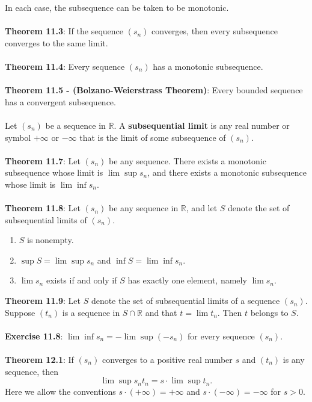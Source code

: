 \documentclass{article}
\theoremstyle{definition}
\DeclareMathOperator{\Inf}{inf}
\DeclareMathOperator{\Sup}{sup}
\begin{document}
In each case, the subsequence can be taken to be monotonic. \\ \\
\textbf{Theorem 11.3}: If the sequence $(s_n)$ converges, then every subsequence converges to the same limit. \\ \\
\textbf{Theorem 11.4}: Every sequence $(s_n)$ has a monotonic subsequence. \\ \\
\textbf{Theorem 11.5 - (Bolzano-Weierstrass Theorem)}: Every bounded sequence has a convergent subsequence. \\ \\
Let $(s_n)$ be a sequence in $\mathbb{R}$. A \textbf{subsequential limit} is any real number or symbol $+\infty$ or $-\infty$ that is the limit of some subsequence of $(s_n)$. \\ \\
\textbf{Theorem 11.7}: Let $(s_n)$ be any sequence. There exists a monotonic subsequence whose limit is $\lim\Sup s_n$, and there exists a monotonic subsequence whose limit is $\lim \Inf s_n$. \\ \\
\textbf{Theorem 11.8}: Let $(s_n)$ be any sequence in $\mathbb{R}$, and let $S$ denote the set of subsequential limits of $(s_n)$. \begin{enumerate}
    \item $S$ is nonempty.
    \item $\Sup S = \lim \Sup s_n$ and $\Inf S = \lim \Inf s_n$.
    \item $\lim s_n$ exists if and only if $S$ has exactly one element, namely $\lim s_n$.
\end{enumerate} $ $ \\
\textbf{Theorem 11.9}: Let $S$ denote the set of subsequential limits of a sequence $(s_n)$. Suppose $(t_n)$ is a sequence in $S \cap \mathbb{R}$ and that $t = \lim t_n$. Then $t$ belongs to $S$. \\ \\
\textbf{Exercise 11.8}: $\lim \Inf s_n = -\lim \Sup(-s_n)$ for every sequence $(s_n)$. \\ \\
\textbf{Theorem 12.1}: If $(s_n)$ converges to a positive real number $s$ and $(t_n)$ is any sequence, then $$\lim \Sup s_nt_n = s \cdot \lim \Sup t_n.$$ Here we allow the conventions $s \cdot (+\infty) = +\infty$ and $s \cdot (-\infty) = -\infty$ for $s > 0$. \\ \\
\end{document}
